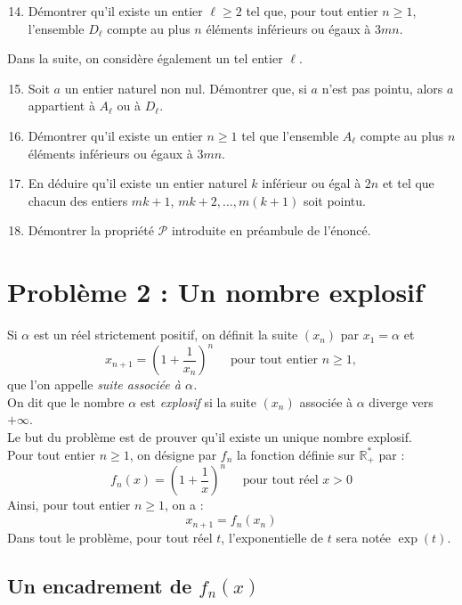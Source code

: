 \documentclass[landscape,twocolumn,leqno,a4paper,10pt]{report} %
\newcommand\n{\noindent}
\newcommand\q{\quad}
\renewcommand{\geq}{\geqslant}
\begin{document}
\begin{enumerate}\setcounter{enumi}{13}
	\item Démontrer qu'il existe un entier $\ell \geq 2$ tel que, pour tout entier $n \geq 1$, l'ensemble $D_{\ell}$ compte au plus $n$ éléments inférieurs ou égaux à $3 mn$.
\end{enumerate}

\n Dans la suite, on considère également un tel entier $\ell$.

\begin{enumerate}\setcounter{enumi}{14}
	\item Soit $a$ un entier naturel non nul. Démontrer que, si $a$ n'est pas pointu, alors $a$ appartient à $A_{\ell}$ ou à $D_{\ell}$.
	\item Démontrer qu'il existe un entier $n \geq 1$ tel que l'ensemble $A_{\ell}$ compte au plus $n$ éléments inférieurs ou égaux à $3mn$.
	\item En déduire qu'il existe un entier naturel $k$ inférieur ou égal à $2 n$ et tel que chacun des entiers $m k+1$, $m k+2, \ldots, m(k+1)$ soit pointu.
	\item Démontrer la propriété $\mathscr{P}$ introduite en préambule de l'énoncé.
\end{enumerate}


\section{Problème 2 : Un nombre explosif}


\n Si $\alpha$ est un réel strictement positif, on définit la suite $\left(x_{n}\right)$ par $x_{1}=\alpha$ et 
$$x_{n+1}=\left(1+\frac{1}{x_{n}}\right)^{n} \q \text{ pour tout entier } n \geq 1,$$
que l'on appelle \textit{suite associée à $\alpha$.}\\
On dit que le nombre $\alpha$ est \textit{explosif} si la suite $\left(x_{n}\right)$ associée à $\alpha$ diverge vers $+\infty$.\\
Le but du problème est de prouver qu'il existe un unique nombre explosif.\\

\n Pour tout entier $n \geq 1$, on désigne par $f_{n}$ la fonction définie sur $\mathbb{R}_{+}^{*}$ par :
$$f_{n}(x)=\left(1+\frac{1}{x}\right)^{n} \q\text{ pour tout réel } x>0$$
Ainsi, pour tout entier $n \geq 1$, on a :
$$x_{n+1}=f_{n}\left(x_{n}\right)$$
Dans tout le problème, pour tout réel $t$, l'exponentielle de $t$ sera notée $\exp(t)$.

\subsection{Un encadrement de $f_{n}(x)$}
\end{document}
